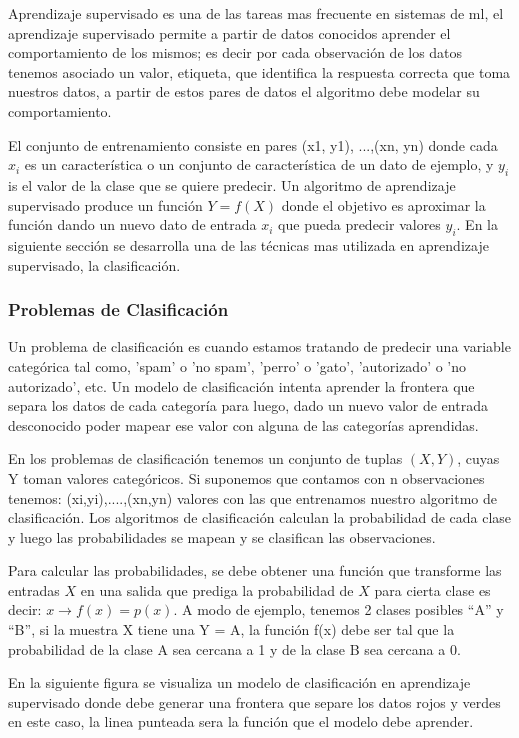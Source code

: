 Aprendizaje supervisado es una de las tareas mas frecuente en sistemas de \ac{ml}, el aprendizaje supervisado permite a partir de datos conocidos aprender el comportamiento de los mismos; es decir por cada observación de los datos tenemos asociado un valor, etiqueta, que identifica la respuesta correcta que toma nuestros datos, a partir de estos pares de datos el algoritmo debe modelar su comportamiento. 

El conjunto de entrenamiento consiste en pares (x1, y1), ...,(xn, yn) donde cada $x_i$  es un característica o un conjunto de característica de un dato de ejemplo, y $y_i$ is el valor de la clase que se quiere predecir. Un algoritmo de aprendizaje supervisado produce un función $Y = f(X)$ donde el objetivo es aproximar la función dando un nuevo dato de entrada $x_i$ que pueda predecir valores $y_i$. En la siguiente sección se desarrolla una de las técnicas mas utilizada en aprendizaje supervisado, la clasificación.


\subsubsection{Problemas de Clasificación}

Un problema de clasificación es cuando estamos tratando de predecir una variable categórica tal como, 'spam' o 'no spam', 'perro' o 'gato', 'autorizado' o 'no autorizado', etc. Un modelo de clasificación intenta aprender la frontera que separa los datos de cada categoría para luego, dado un nuevo valor de entrada desconocido poder mapear ese valor con alguna de las categorías aprendidas.

En los problemas de clasificación tenemos un conjunto de tuplas $(X,Y)$, cuyas Y toman valores categóricos. Si suponemos que contamos con n observaciones tenemos: (xi,yi),....,(xn,yn) valores con las que entrenamos nuestro algoritmo de clasificación. Los algoritmos de clasificación  calculan la probabilidad de cada clase y luego las probabilidades se mapean y se clasifican las observaciones.

Para calcular las probabilidades, se debe obtener una función que transforme las entradas $X$ en una salida que prediga la probabilidad de $X$ para cierta clase es decir: $ x \longrightarrow f(x) = p(x) $. A modo de ejemplo,  tenemos 2 clases posibles “A” y “B”, si la muestra X tiene una Y = A, la función f(x) debe ser tal que la probabilidad de la clase A sea cercana a 1 y  de la clase B sea cercana a 0.

En la siguiente figura se visualiza un modelo de clasificación en aprendizaje supervisado donde debe generar una frontera que separe los datos rojos y verdes en este caso, la linea punteada sera la función que el modelo debe aprender. 


